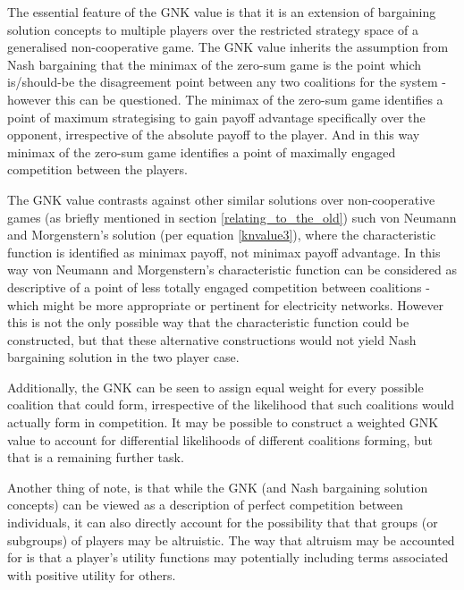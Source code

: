 The essential feature of the GNK value is that it is an extension of bargaining solution concepts to multiple players over the restricted strategy space of a generalised non-cooperative game.
The GNK value inherits the assumption from Nash bargaining that the minimax of the zero-sum game is the point which is/should-be the disagreement point between any two coalitions for the system - however this can be questioned.
The minimax of the zero-sum game identifies a point of maximum strategising to gain payoff advantage specifically over the opponent, irrespective of the absolute payoff to the player.
And in this way minimax of the zero-sum game identifies a point of maximally engaged competition between the players.

The GNK value contrasts against other similar solutions over non-cooperative games (as briefly mentioned in section \ref{relating_to_the_old}) such von Neumann and Morgenstern's solution (per equation \ref{knvalue3}), where the characteristic function is identified as minimax payoff, not minimax payoff advantage.
In this way von Neumann and Morgenstern's characteristic function can be considered as descriptive of a point of less totally engaged competition between coalitions - which might be more appropriate or pertinent for electricity networks.
However this is not the only possible way that the characteristic function could be constructed, but that these alternative constructions would not yield Nash bargaining solution in the two player case.

Additionally, the GNK can be seen to assign equal weight for every possible coalition that could form, irrespective of the likelihood that such coalitions would actually form in competition.
It may be possible to construct a weighted GNK value to account for differential likelihoods of different coalitions forming, but that is a remaining further task.

Another thing of note, is that while the GNK (and Nash bargaining solution concepts) can be viewed as a description of perfect competition between individuals, it can also directly account for the possibility that that groups (or subgroups) of players may be altruistic.
The way that altruism may be accounted for is that a player's utility functions may potentially including terms associated with positive utility for others.

